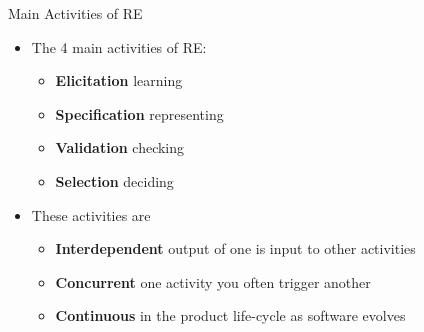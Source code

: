 
\begin{Slide}{Main Activities of RE}


\begin{itemize}
\item The 4 main activities of RE: 
\begin{itemize}
\item \textbf{Elicitation} \hfill learning
\item \textbf{Specification} \hfill representing
\item \textbf{Validation}  \hfill checking
\item \textbf{Selection}   \hfill deciding
\end{itemize}
\item These activities are
\begin{itemize}
\item \textbf{Interdependent} \hfill output of one is input to other activities
\item \textbf{Concurrent} \hfill one activity you often trigger another
\item \textbf{Continuous} \hfill in the product life-cycle as software evolves

\end{itemize}
\end{itemize}
\end{Slide}